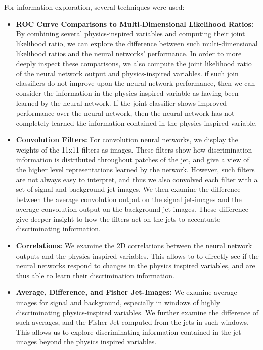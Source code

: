 For information exploration, several techniques were used:
\begin{itemize}

\item \textbf{ROC Curve Comparisons to Multi-Dimensional Likelihood Ratios:}  By combining several physics-inspired variables and computing their joint likelihood ratio, we can explore the difference between such multi-dimensional likelihood ratios and the neural networks' performance.  In order to more deeply inspect these comparisons, we also compute the joint likelihood ratio of the neural network output and physics-inspired variables.  if such join classifiers do not improve upon the neural network performance, then we can consider the information in the physics-inspired variable as having been learned by the neural network.  If the joint classifier shows improved performance over the neural network, then the neural network has not completely learned the information contained in the physics-inspired variable.

\item \textbf{Convolution Filters:}  For convolution neural networks, we display the weights of the 11x11 filters as images.  These filters show how discrimination information is distributed throughout patches of the jet, and give a view of the higher level representations learned by the network.  However, such filters are not always easy to interpret, and thus we also convolved each filter with a set of signal and background jet-images.  We then examine the difference between the average convolution output on the signal jet-images and the average convolution output on the background jet-images.  These difference give deeper insight to how the filters act on the jets to accentuate discriminating information.

\item \textbf{Correlations:}  We examine the 2D correlations between the neural network outputs and the physics inspired variables.  This allows to to directly see if the neural networks respond to changes in the physics inspired variables, and are thus able to learn their discrimination information.

\item \textbf{Average, Difference, and Fisher Jet-Images:}  We examine average images for signal and background, especially in windows of highly discriminating physics-inspired variables.  We further examine the difference of such averages, and the Fisher Jet computed from the jets in such windows.  This allows us to explore discriminating information contained in the jet images beyond the physics inspired variables.


\end{itemize}

